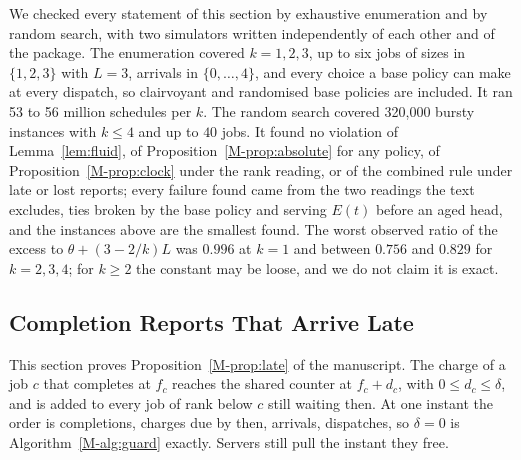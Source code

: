 \documentclass[mathematics,supfile,submit,moreauthors]{Definitions/mdpi}
\begin{document}
We checked every statement of this section by exhaustive enumeration and by random
search, with two simulators written independently of each other and of the package. The
enumeration covered $k = 1, 2, 3$, up to six jobs of sizes in $\{1, 2, 3\}$ with
$L = 3$, arrivals in $\{0, \dots, 4\}$, and every choice a base policy can make at every
dispatch, so clairvoyant and randomised base policies are included. It ran 53 to 56
million schedules per $k$. The random search covered 320{,}000 bursty instances with
$k \le 4$ and up to $40$ jobs. It found no violation of Lemma~\ref{lem:fluid}, of
Proposition~\ref*{M-prop:absolute} for any policy, of Proposition~\ref*{M-prop:clock} under the rank reading, or of the combined
rule under late or lost reports; every failure found came from the two readings the
text excludes, ties broken by the base policy and serving $E(t)$ before an aged
head, and the instances above are the smallest found. The worst observed ratio of the excess
to $\theta + (3-2/k)L$ was $0.996$ at $k = 1$ and between $0.756$ and $0.829$ for
$k = 2, 3, 4$; for $k \ge 2$ the constant may be loose, and we do not claim it is exact.

\subsection{Completion Reports That Arrive Late}
\label{sec:supp_late}

This section proves Proposition~\ref*{M-prop:late} of the manuscript. The charge of a job $c$ that
completes at $f_c$ reaches the shared counter at $f_c + d_c$, with
$0 \le d_c \le \delta$, and is added to every job of rank below $c$ still waiting then.
At one instant the order is completions, charges due by then, arrivals, dispatches, so
$\delta = 0$ is Algorithm~\ref*{M-alg:guard} exactly. Servers still pull the instant they free.
\end{document}
